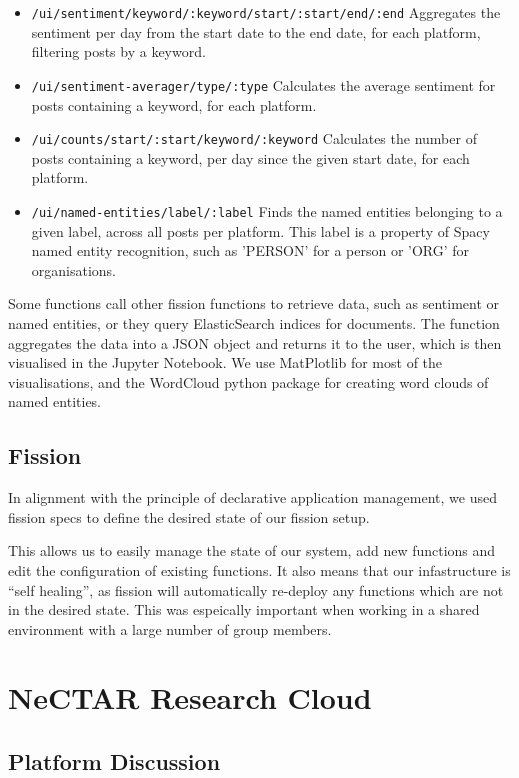 \documentclass[]{article}
\numberwithin{equation}{section}
\begin{document}
\begin{itemize}[label=-]
    \item \texttt{/ui/sentiment/keyword/:keyword/start/:start/end/:end} Aggregates the sentiment per day from the start date to the end date, for each platform, filtering posts by a keyword.
    \item \texttt{/ui/sentiment-averager/type/:type} Calculates the average sentiment for posts containing a keyword, for each platform.
    \item \texttt{/ui/counts/start/:start/keyword/:keyword} Calculates the number of posts containing a keyword, per day since the given start date, for each platform.
    \item \texttt{/ui/named-entities/label/:label} Finds the named entities belonging to a given label, across all posts per platform. This label is a property of Spacy named entity recognition, such as 'PERSON' for a person or 'ORG' for organisations.
\end{itemize}

Some functions call other fission functions to retrieve data, such as sentiment or named entities, or they query ElasticSearch indices for documents.
The function aggregates the data into a JSON object and returns it to the user, which is then visualised in the Jupyter Notebook.
We use MatPlotlib for most of the visualisations, and the WordCloud python package for creating word clouds of named entities.

\subsection*{Fission}

In alignment with the principle of declarative application management, we used fission specs to define the desired state of our fission setup. 

This allows us to easily manage the state of our system, add new functions and edit the configuration of existing functions.
It also means that our infastructure is ``self healing'', as fission will automatically re-deploy any functions which are not in the desired state.
This was espeically important when working in a shared environment with a large number of group members.

\section*{NeCTAR Research Cloud}

\subsection*{Platform Discussion}
\end{document}
